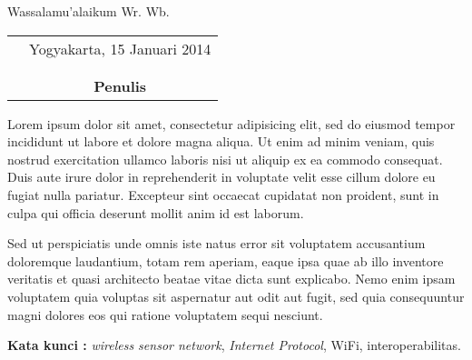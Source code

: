 \documentclass{jtetiskripsi}
\begin{document}
\vspace{0.5cm}

Wassalamu'alaikum Wr. Wb.

\begin{tabular}{p{7.5cm}c}
&Yogyakarta, 15 Januari 2014\\
&\\
&\\
&\textbf{Penulis}
\end{tabular}

\tableofcontents
{}
\listoftables
{}
\listoffigures
{}


\begin{abstractind}
Lorem ipsum dolor sit amet, consectetur adipisicing elit, sed do eiusmod tempor incididunt ut labore et dolore magna aliqua. Ut enim ad minim veniam, quis nostrud exercitation ullamco laboris nisi ut aliquip ex ea commodo consequat. Duis aute irure dolor in reprehenderit in voluptate velit esse cillum dolore eu fugiat nulla pariatur. Excepteur sint occaecat cupidatat non proident, sunt in culpa qui officia deserunt mollit anim id est laborum.

Sed ut perspiciatis unde omnis iste natus error sit voluptatem accusantium doloremque laudantium, totam rem aperiam, eaque ipsa quae ab illo inventore veritatis et quasi architecto beatae vitae dicta sunt explicabo. Nemo enim ipsam voluptatem quia voluptas sit aspernatur aut odit aut fugit, sed quia consequuntur magni dolores eos qui ratione voluptatem sequi nesciunt.


\bigskip
\noindent
\textbf{Kata kunci :} \emph{wireless sensor network}, \emph{Internet Protocol}, WiFi, interoperabilitas.
\end{abstractind}
\end{document}
